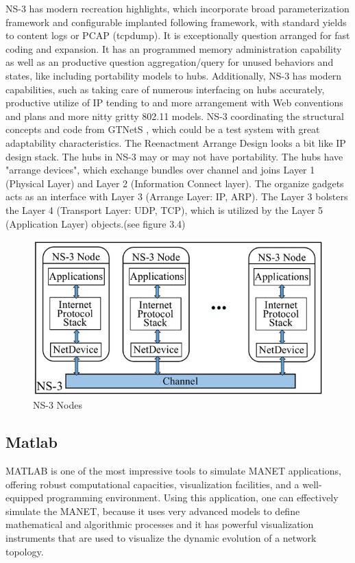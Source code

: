 \documentclass[]{nsm-thesis}
\begin{document}
NS-3 has modern recreation highlights, which incorporate
broad parameterization framework and configurable implanted
following framework, with standard yields to content logs or PCAP
(tcpdump). It is exceptionally question arranged for fast coding and
expansion. It has an programmed memory administration capability
as well as an productive question aggregation/query for unused
behaviors and states, like including portability models to hubs.
Additionally, NS-3 has modern capabilities, such as taking care of
numerous interfacing on hubs accurately, productive utilize of IP
tending to and more arrangement with Web conventions and
plans and more nitty gritty 802.11 models. NS-3 coordinating
the structural concepts and code from GTNetS\cite{1261483} , which
could be a test system with great adaptability characteristics. The
Reenactment Arrange Design looks a bit like IP design
stack. The hubs in NS-3 may or may not have portability. The
hubs have "arrange devices", which exchange bundles over
channel and joins Layer 1 (Physical Layer) and Layer 2
(Information Connect layer). The organize gadgets acts as an interface
with Layer 3 (Arrange Layer: IP, ARP). The Layer 3 bolsters
the Layer 4 (Transport Layer: UDP, TCP), which is utilized by the
Layer 5 (Application Layer) objects.(see figure 3.4)

\begin{figure}[h]
\graphicspath{{/image/}} %
\centering
\includegraphics[scale=0.4]{image/Data-flow-model-in-NS-3-Simulation-at-a-High-level_W640.jpeg} %
\caption{NS-3 Nodes \cite{article}}
\label{fig:mesh6} %
\end{figure}

\subsection{Matlab}
MATLAB is one of the most impressive tools to simulate MANET applications, offering robust computational capacities, visualization facilities, and a well-equipped programming environment. Using this application, one can effectively simulate the MANET, because it uses very advanced models to define mathematical and algorithmic processes and it has powerful visualization instruments that are used to visualize the dynamic evolution of a network topology.
\end{document}
